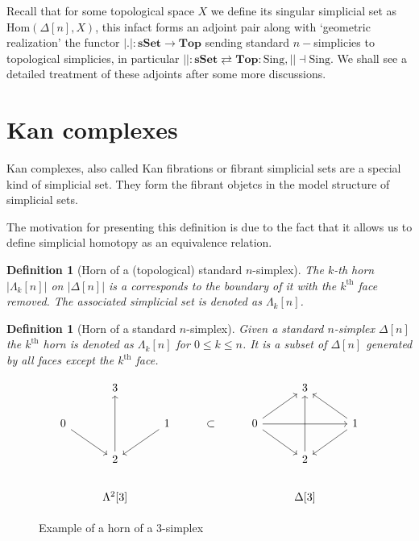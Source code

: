 \documentclass[12pt]{report}
\numberwithin{equation}{section}
\newcommand{\Hom}{{\mathrm{Hom}}}
\newtheorem{definition}[dummy]{Definition}
\begin{document}
	

	Recall that for some topological space $X$ we define its singular simplicial set as $\Hom(\Delta[n],X)$, this infact forms an adjoint pair along with `geometric realization' the functor  $|.|: \mathbf{sSet} \to \mathbf{Top}$ sending standard $n-$simplicies to topological simplicies, in particular $||:\mathbf{sSet} \rightleftarrows \mathbf{Top}: \mathrm{Sing}, || \dashv \mathrm{Sing}$. We shall see a detailed treatment of these adjoints after some more discussions.
	

	\section{Kan complexes}
	Kan complexes, also called Kan fibrations or fibrant simplicial sets are a special kind of simplicial set. They form the fibrant objetcs in the model structure of simplicial sets.
	
	The motivation for presenting this definition is due to the fact that it allows us to define simplicial homotopy as an equivalence relation. 
	
	\begin{definition}[Horn of a (topological) standard $n$-simplex]
		The $k$-th horn $|\Lambda_k[n]|$ on $|\Delta[n]|$ is a corresponds to the boundary of it with the $k^{\mathrm{th}}$ face removed. The associated simplicial set is denoted as $\Lambda_k[n]$.
	\end{definition}
	
	\begin{definition}[Horn of a standard $n$-simplex]
		Given a standard $n$-simplex $\Delta[n]$ the $k^\text{th}$ horn is denoted as $\Lambda_k[n]$ for $0 \leq k \leq n$. It is a subset of $\Delta[n]$ generated by all faces except the $k^\text{th}$ face.
	\end{definition}
	
	
		\begin{figure}[!htb]
		\centering
		\[\begin{tikzcd}
		& 3 &&&& 3 \\
		0 && 1 & \subset & 0 && 1 \\
		& 2 &&&& 2 \\
		& {\Lambda^2[3]} &&&& {\Delta[3]}
		\arrow[from=2-1, to=3-2]
		\arrow[from=2-3, to=3-2]
		\arrow[from=2-5, to=1-6]
		\arrow[from=2-5, to=2-7]
		\arrow[from=2-5, to=3-6]
		\arrow[from=2-7, to=1-6]
		\arrow[from=2-7, to=3-6]
		\arrow[from=3-2, to=1-2]
		\arrow[from=3-6, to=1-6]
		\end{tikzcd}\]
		\caption{Example of a horn of a $3$-simplex}
		\label{fig:horn}
	\end{figure}
	
\end{document}
